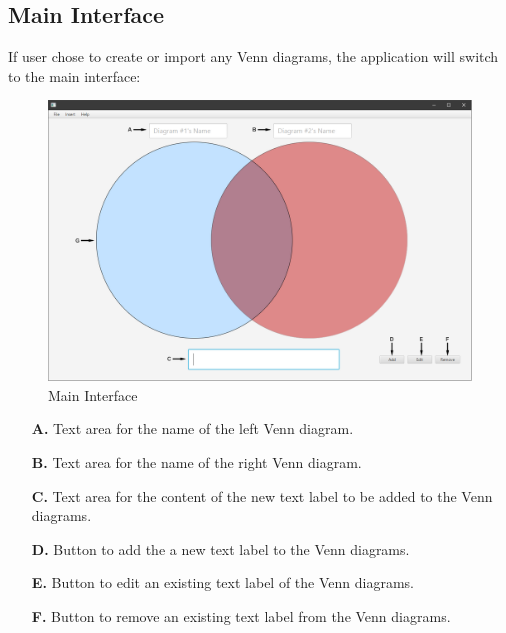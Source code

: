 \documentclass[fontsize=12pt,paper=letter,twoside]{scrartcl}
\begin{document}
\subsection{Main Interface}

If user chose to create or import any Venn diagrams, the application will switch to the main interface:

\begin{figure}[hbt]
	\begin{mdframed}
		\includegraphics[width=\textwidth]{images/main-screenshot.png}
	\end{mdframed}
	\caption{Main Interface}
\end{figure}

\begin{itemize}
	\item[\textbf{A.}] {
		Text area for the name of the left Venn diagram.
	}
	\item[\textbf{B.}] {
		Text area for the name of the right Venn diagram.
	}
	\item[\textbf{C.}] {
		Text area for the content of the new text label to be added to the Venn diagrams.
	}
	\item[\textbf{D.}] {
		Button to add the a new text label to the Venn diagrams.
	}
	\item[\textbf{E.}] {
		Button to edit an existing text label of the Venn diagrams.
	}
	\item[\textbf{F.}] {
		Button to remove an existing text label from the Venn diagrams.
	}
\end{itemize}


\newpage
\end{document}
